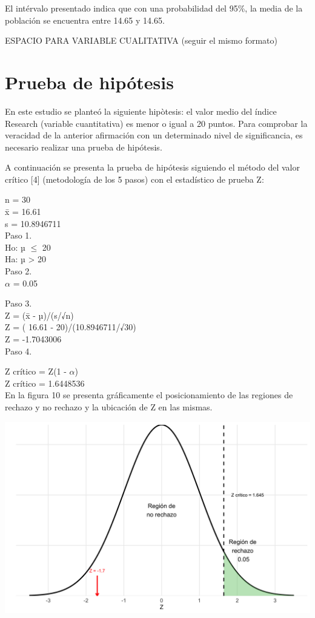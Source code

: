 \documentclass[
]{article}
\begin{document}
\begin{multicols}{2}
El intérvalo presentado indica que con una probabilidad del 95\%, la media de la población se encuentra entre 14.65 y 14.65.

ESPACIO PARA VARIABLE CUALITATIVA (seguir el mismo formato)

\section{Prueba de hipótesis}



En este estudio se planteó la siguiente hipòtesis: el valor medio del índice Research (variable cuantitativa) es menor o igual a 20 puntos. Para comprobar la veracidad de la anterior afirmación con un determinado nivel de significancia, es necesario realizar una prueba de hipótesis.

A continuación se presenta la prueba de hipótesis siguiendo el método del valor crítico [4] (metodología de los 5 pasos) con el estadístico de prueba Z:

n = 30\\
x̄ = 16.61\\
s =  10.8946711\\

Paso 1.\\
Ho: µ $≤$ 20\\
Ha: µ > 20\\

Paso 2.\\
$\alpha$ = 0.05

Paso 3.\\
Z = (x̄ - µ)/(s/√n)\\
Z = ( 16.61 - 20)/(10.8946711/√30)\\
Z = -1.7043006\\

Paso 4.

Z crítico = Z(1 - $\alpha$)\\
Z crítico = 1.6448536\\

En la figura 10 se presenta gráficamente el posicionamiento de las regiones de rechazo y no rechazo y la ubicación de Z en las mismas.


\begin{center}
\includegraphics[width=\linewidth]{figura10.png}
\end{center}


\end{multicols}
\end{document}

